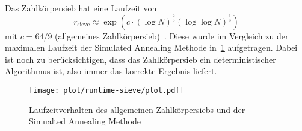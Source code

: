 Das Zahlkörpersieb hat eine Laufzeit von 
\begin{equation}
		r_\mathrm{sieve}\approx\exp\left(c\cdot{\left(\log N\right)}^\frac{2}{3}{\left(\log\log N\right)}^\frac{1}{3}\right)\label{eq:runtime-sieve}
\end{equation}
mit $c=64/9$ (allgemeines Zahlkörpersieb)~\parencite{pomerance}. Diese wurde im Vergleich zu der maximalen Laufzeit der Simulated Annealing Methode in~\ref{fig:runtime-sieve} aufgetragen. Dabei ist noch zu berücksichtigen, dass das Zahlkörpersieb ein deterministischer Algorithmus ist, also immer das korrekte Ergebnis liefert.
\begin{figure}[ht]
		\centering
		\texttt{[image: plot/runtime-sieve/plot.pdf]}
		\caption{Laufzeitverhalten des allgemeinen Zahlkörpersiebs und der Simualted Annealing Methode}\label{fig:runtime-sieve}
\end{figure}
